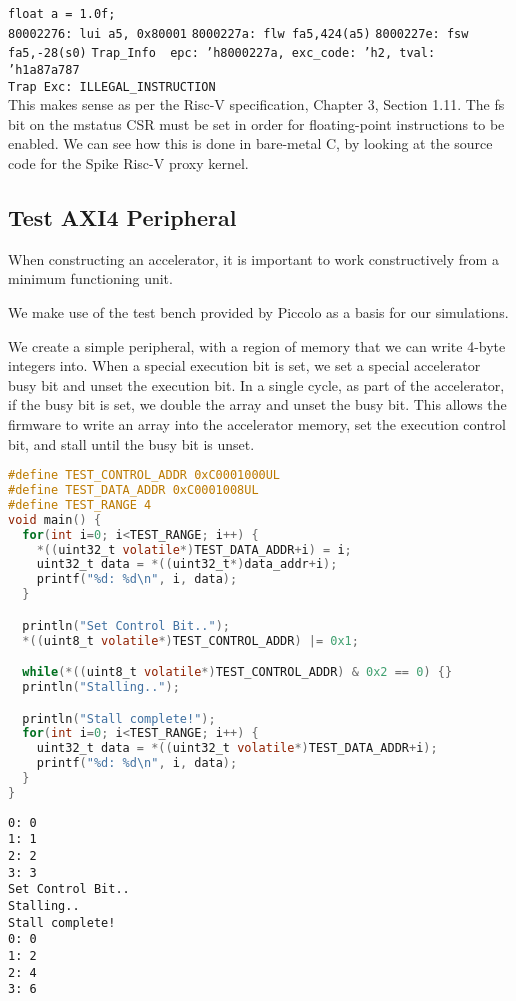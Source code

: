 \documentclass[a4paper,9pt]{report}
\begin{document}
\texttt{float a = 1.0f;} \\
\texttt{80002276: lui a5, 0x80001}
\texttt{8000227a: flw fa5,424(a5)}
\texttt{8000227e: fsw fa5,-28(s0)}
\texttt{Trap\_Info { epc: 'h8000227a, exc\_code: 'h2, tval: 'h1a87a787 }} \\
\texttt{Trap Exc: ILLEGAL\_INSTRUCTION} \\

This makes sense as per the Risc-V specification, Chapter 3, Section 1.11.
The fs bit on the mstatus CSR must be set in order for floating-point
instructions to be enabled. We can see how this is done in bare-metal C, by
looking at the source code for the Spike Risc-V proxy kernel.


\subsection{Test AXI4 Peripheral}
When constructing an accelerator, it is important to work constructively from a minimum
functioning unit.

We make use of the test bench provided by Piccolo as a basis for our
simulations.

We create a simple peripheral, with a region of memory that we can write 4-byte
integers into. When a special execution bit is set, we set a special accelerator
busy bit and unset the execution bit. In a single cycle, as part of the
accelerator, if the busy bit is set, we double the array and unset the busy bit.
This allows the firmware to write an array into the accelerator memory, set the
execution control bit, and stall until the busy bit is unset.

\begin{lstlisting}[language=C,style=customc]
#define TEST_CONTROL_ADDR 0xC0001000UL
#define TEST_DATA_ADDR 0xC0001008UL
#define TEST_RANGE 4
void main() {
  for(int i=0; i<TEST_RANGE; i++) {
    *((uint32_t volatile*)TEST_DATA_ADDR+i) = i;
    uint32_t data = *((uint32_t*)data_addr+i);
    printf("%d: %d\n", i, data);
  }

  println("Set Control Bit..");
  *((uint8_t volatile*)TEST_CONTROL_ADDR) |= 0x1;

  while(*((uint8_t volatile*)TEST_CONTROL_ADDR) & 0x2 == 0) {}
  println("Stalling..");

  println("Stall complete!");
  for(int i=0; i<TEST_RANGE; i++) {
    uint32_t data = *((uint32_t volatile*)TEST_DATA_ADDR+i);
    printf("%d: %d\n", i, data);
  }
}
\end{lstlisting}
\begin{verbatim}
0: 0
1: 1
2: 2
3: 3
Set Control Bit..
Stalling..
Stall complete!
0: 0
1: 2
2: 4
3: 6
\end{verbatim}
\end{document}
